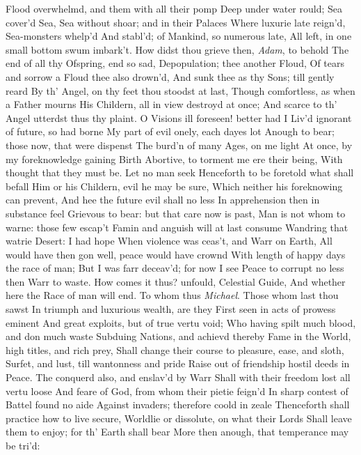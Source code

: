 \documentclass[11pt]{book}
\newcounter {last}
\begin{document}
Flood overwhelmd, and them with all their pomp 
Deep under water rould; Sea cover'd Sea, 
Sea without shoar; and in their Palaces 
Where luxurie late reign'd, Sea-monsters whelp'd 
And stabl'd; of Mankind, so numerous late, 
All left, in one small bottom swum imbark't. 
How didst thou grieve then, \textit{Adam}, to behold 
The end of all thy Ofspring, end so sad, 
Depopulation; thee another Floud, 
Of tears and sorrow a Floud thee also drown'd, 
And sunk thee as thy Sons; till gently reard 
By th' Angel, on thy feet thou stoodst at last, 
Though comfortless, as when a Father mourns 
His Childern, all in view destroyd at once; 
And scarce to th' Angel utterdst thus thy plaint. 
\quad O Visions ill foreseen! better had I 
Liv'd ignorant of future, so had borne 
My part of evil onely, each dayes lot 
Anough to bear; those now, that were dispenst 
The burd'n of many Ages, on me light 
At once, by my foreknowledge gaining Birth 
Abortive, to torment me ere their being, 
With thought that they must be.  Let no man seek 
Henceforth to be foretold what shall befall 
Him or his Childern, evil he may be sure, 
Which neither his foreknowing can prevent, 
And hee the future evil shall no less 
In apprehension then in substance feel 
Grievous to bear: but that care now is past, 
Man is not whom to warne: those few escap't 
Famin and anguish will at last consume 
Wandring that watrie Desert: I had hope 
When violence was ceas't, and Warr on Earth, 
All would have then gon well, peace would have crownd 
With length of happy days the race of man; 
But I was farr deceav'd; for now I see 
Peace to corrupt no less then Warr to waste. 
How comes it thus? unfould, Celestial Guide, 
And whether here the Race of man will end. 
To whom thus \textit{Michael}.  Those whom last thou sawst 
In triumph and luxurious wealth, are they 
First seen in acts of prowess eminent 
And great exploits, but of true vertu void; 
Who having spilt much blood, and don much waste 
Subduing Nations, and achievd thereby 
Fame in the World, high titles, and rich prey, 
Shall change their course to pleasure, ease, and sloth, 
Surfet, and lust, till wantonness and pride 
Raise out of friendship hostil deeds in Peace. 
The conquerd also, and enslav'd by Warr 
Shall with their freedom lost all vertu loose 
And feare of God, from whom their pietie feign'd 
In sharp contest of Battel found no aide 
Against invaders; therefore coold in zeale 
Thenceforth shall practice how to live secure, 
Worldlie or dissolute, on what their Lords 
Shall leave them to enjoy; for th' Earth shall bear 
More then anough, that temperance may be tri'd: 
\end{document}
